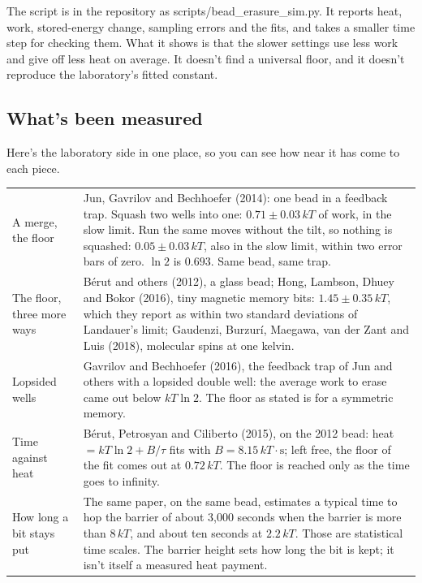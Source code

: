 \documentclass[11pt,twoside]{article}
\theoremstyle{thielethm}
\theoremstyle{thieledef}
\theoremstyle{thieledef}
\theoremstyle{thieledef}
\theoremstyle{thielethm}
\theoremstyle{thieleobs}
\theoremstyle{thielethm}
\begin{document}
The script is in the repository as scripts/bead\_erasure\_sim.py. It reports heat, work, stored-energy change, sampling errors and the fits, and takes a smaller time step for checking them. What it shows is that the slower settings use less work and give off less heat on average. It doesn't find a universal floor, and it doesn't reproduce the laboratory's fitted constant.

\subsection{What's been measured}

Here's the laboratory side in one place, so you can see how near it has come to each piece.

\begingroup\small
\begin{longtable}{p{} p{}}
A merge, the floor & Jun, Gavrilov and Bechhoefer (2014): one bead in a feedback trap.
Squash two wells into one: $0.71 \pm 0.03\,kT$ of work, in the slow limit. Run the same
moves without the tilt, so nothing is squashed: $0.05 \pm 0.03\,kT$, also in the slow limit,
within two error bars of zero. $\ln 2$ is $0.693$. Same bead, same trap. \\[3pt]
The floor, three more ways & B\'erut and others (2012), a glass bead; Hong, Lambson, Dhuey
and Bokor (2016), tiny magnetic memory bits: $1.45 \pm 0.35\,kT$, which they report as
within two standard deviations of Landauer's limit;
Gaudenzi, Burzur\'i, Maegawa, van der Zant and Luis (2018), molecular spins at one kelvin. \\[3pt]
Lopsided wells & Gavrilov and Bechhoefer (2016), the feedback trap of Jun and others with a
lopsided double well: the average work to erase came out below $kT\ln 2$. The floor as
stated is for a symmetric memory. \\[3pt]
Time against heat & B\'erut, Petrosyan and Ciliberto (2015), on the 2012 bead: heat
$= kT\ln 2 + B/\tau$ fits with $B = 8.15\,kT\cdot\mathrm{s}$; left free, the floor of the fit
comes out at $0.72\,kT$. The floor is reached only as the time goes to infinity. \\[3pt]
How long a bit stays put & The same paper, on the same bead, estimates a typical time to hop the
barrier of about 3,000 seconds when the barrier is more than $8\,kT$, and about ten seconds at $2.2\,kT$. Those are
statistical time scales. The barrier height sets how long the bit is kept; it isn't itself
a measured heat payment. \\
\end{longtable}
\endgroup
\end{document}
